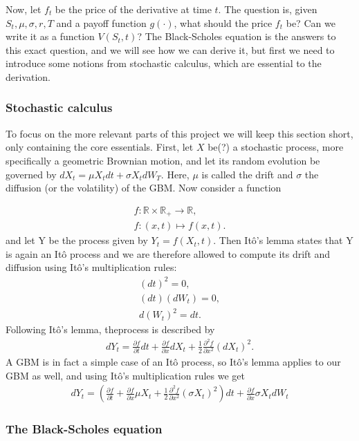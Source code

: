 Now, let $f_t$ be the price of the derivative at time $t$. The question is, given $S_t, \mu, \sigma, r, T$ and a payoff function $g(\cdot)$, what should the price $f_t$ be? Can we write it as a function $V(S_t,t)$? The Black-Scholes equation is the answers to this exact question, and we will see how we can derive it, but first we need to introduce some notions from stochastic calculus, which are essential to the derivation. 

\subsubsection{Stochastic calculus}
To focus on the more relevant parts of this project we will keep this section short, only containing the core essentials. First, let $X$ be(?) a stochastic process, more specifically a geometric Brownian motion, and let its random evolution be governed by $dX_t = \mu X_tdt + \sigma X_tdW_T$. Here, $\mu$ is called the drift and $\sigma$ the diffusion (or the volatility) of the GBM. Now consider a function 


\begin{gather*}
    f\colon \mathbb{R} \times \mathbb{R}_+ \rightarrow \mathbb{R},
    \\f\colon (x,t) \mapsto f(x,t).
\end{gather*}
and let Y be the process given by $Y_t = f(X_t,t)$. Then Itô's lemma states that Y is again an Itô process and we are therefore allowed to compute its drift and diffusion using Itô's multiplication rules:
\begin{align*}
    (dt)^2 = 0,
    \\(dt)(dW_t) = 0,
    \\d(W_t)^2 = dt.
\end{align*}
Following Itô's lemma, theprocess is described by
\begin{align*}
    dY_t = \frac{\partial{f}}{\partial{t}}dt + \frac{\partial{f}}{\partial{x}}dX_t + \frac{1}{2}\frac{\partial^2{f}}{\partial{x^2}}(dX_t)^2.
\end{align*}
A GBM is in fact a simple case of an Itô process, so Itô's lemma applies to our GBM as well, and using Itô's multiplication rules we get
\begin{align*}
    dY_t = \left(\frac{\partial{f}}{\partial{t}} + \frac{\partial{f}}{\partial{x}}\mu X_t + \frac{1}{2}\frac{\partial^2{f}}{\partial{x^2}}(\sigma X_t)^2\right)dt + \frac{\partial{f}}{\partial{x}}\sigma X_tdW_t
\end{align*}


\subsubsection{The Black-Scholes equation}

